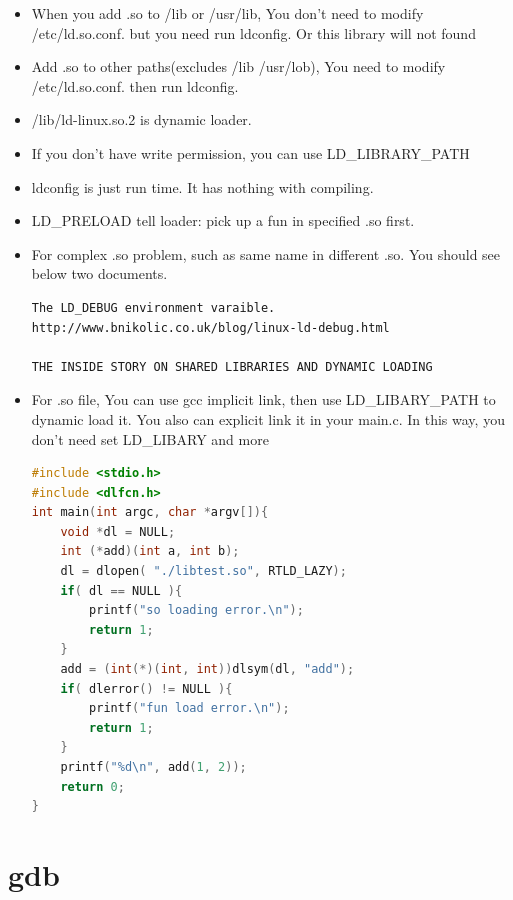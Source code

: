 \documentclass[a4paper,12pt,twoside]{book}
\begin{document}
\begin{itemize}
\begin{itemize}
\begin{itemize}
				\item When you add .so to /lib or /usr/lib, You don't need to modify /etc/ld.so.conf. but you need run ldconfig.  Or this library will not found 

				\item Add .so to other paths(excludes /lib /usr/lob), You need to modify /etc/ld.so.conf. then run ldconfig. 
				\item /lib/ld-linux.so.2 is dynamic loader. 
				\item If you don't have write permission, you can use LD\_LIBRARY\_PATH

				\item ldconfig is just run time. It has nothing with compiling. 

				\item LD\_PRELOAD tell loader: pick up a fun in specified .so first. 
				\item For complex .so problem, such as same name in different .so.  You should see below two documents. 

\begin{verbatim}
The LD_DEBUG environment varaible.
http://www.bnikolic.co.uk/blog/linux-ld-debug.html	

THE INSIDE STORY ON SHARED LIBRARIES AND DYNAMIC LOADING			
\end{verbatim}			
  	 
		\item For .so file, You can use gcc implicit link, then use LD\_LIBARY\_PATH to dynamic load it. You also can explicit link it in your main.c. In this way, you don't need set LD\_LIBARY and more 

\begin{lstlisting}[frame=single, language=c++]
#include <stdio.h>
#include <dlfcn.h>
int main(int argc, char *argv[]){
	void *dl = NULL;
	int (*add)(int a, int b);
	dl = dlopen( "./libtest.so", RTLD_LAZY);
	if( dl == NULL ){
		printf("so loading error.\n");
		return 1;
	}
    add = (int(*)(int, int))dlsym(dl, "add");
	if( dlerror() != NULL ){
        printf("fun load error.\n");
		return 1;
	}
	printf("%d\n", add(1, 2));
	return 0;
}
\end{lstlisting}

 \end{itemize}


\section{gdb}

\end{itemize}
\end{itemize}
\end{document}
